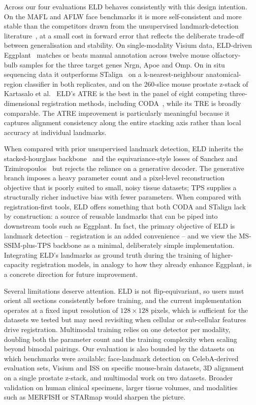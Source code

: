 \documentclass[11pt]{article}
\begin{document}
Across our four evaluations ELD behaves consistently with this design intention. On the MAFL and AFLW face benchmarks it is more self-consistent and more stable than the competitors drawn from the unsupervised landmark-detection literature~\cite{sanchez2019object,jakab2018conditional,zhang2018unsupervised}, at a small cost in forward error that reflects the deliberate trade-off between generalisation and stability. On single-modality Visium data, ELD-driven Eggplant~\cite{bergenstrahle2021eggplant} matches or beats manual annotation across twelve mouse olfactory-bulb samples for the three target genes Nrgn, Apoe and Omp. On in situ sequencing data it outperforms STalign~\cite{clifton2023stalign} on a k-nearest-neighbour anatomical-region classifier in both replicates, and on the 260-slice mouse prostate z-stack of Kartasalo et al.~\cite{kartasalo2018comparative} ELD's ATRE is the best in the panel of eight competing three-dimensional registration methods, including CODA~\cite{kiemen2022coda}, while its TRE is broadly comparable. The ATRE improvement is particularly meaningful because it captures alignment consistency along the entire stacking axis rather than local accuracy at individual landmarks.

When compared with prior unsupervised landmark detection, ELD inherits the stacked-hourglass backbone~\cite{newell2016stacked} and the equivariance-style losses of Sanchez and Tzimiropoulos~\cite{sanchez2019object} but rejects the reliance on a generative decoder. The generative branch imposes a heavy parameter count and a pixel-level reconstruction objective that is poorly suited to small, noisy tissue datasets; TPS supplies a structurally richer inductive bias with fewer parameters. When compared with registration-first tools, ELD offers something that both CODA and STalign lack by construction: a source of reusable landmarks that can be piped into downstream tools such as Eggplant. In fact, the primary objective of ELD is landmark detection -- registration is an added convenience -- and we view the MS-SSIM-plus-TPS backbone as a minimal, deliberately simple implementation. Integrating ELD's landmarks as ground truth during the training of higher-capacity registration models, in analogy to how they already enhance Eggplant, is a concrete direction for future improvement.

Several limitations deserve attention. ELD is not flip-equivariant, so users must orient all sections consistently before training, and the current implementation operates at a fixed input resolution of $128\times 128$ pixels, which is sufficient for the datasets we tested but may need revisiting when cellular or sub-cellular features drive registration. Multimodal training relies on one detector per modality, doubling both the parameter count and the training complexity when scaling beyond bimodal pairings. Our evaluation is also bounded by the datasets on which benchmarks were available: face-landmark detection on CelebA-derived evaluation sets, Visium and ISS on specific mouse-brain datasets, 3D alignment on a single prostate z-stack, and multimodal work on two datasets. Broader validation on human clinical specimens, larger tissue volumes, and modalities such as MERFISH or STARmap would sharpen the picture.
\end{document}
